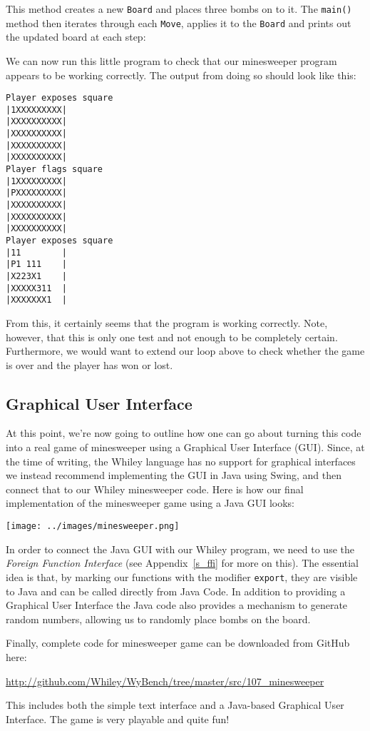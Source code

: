 

This method creates a new \lstinline{Board} and places three bombs on to it.  The \lstinline{main()} method then iterates through each \lstinline{Move}, applies it to the \lstinline{Board} and prints out the updated board at each step:



We can now run this little program to check that our minesweeper program appears to be working correctly.  The output from doing so should look like this:

\begin{lstlisting}
Player exposes square
|1XXXXXXXXX|
|XXXXXXXXXX|
|XXXXXXXXXX|
|XXXXXXXXXX|
|XXXXXXXXXX|
Player flags square
|1XXXXXXXXX|
|PXXXXXXXXX|
|XXXXXXXXXX|
|XXXXXXXXXX|
|XXXXXXXXXX|
Player exposes square
|11        |
|P1 111    |
|X223X1    |
|XXXXX311  |
|XXXXXXX1  |
\end{lstlisting}
From this, it certainly seems that the program is working correctly.  Note, however, that this is only one test and not enough to be completely certain.  Furthermore, we would want to extend our loop above to check whether the game is over and the player has won or lost.
\subsection{Graphical User Interface}
At this point, we're now going to outline how one can go about turning this code into a real game of minesweeper using a Graphical User Interface (GUI).  Since, at the time of writing, the Whiley language has no support for graphical interfaces we instead recommend implementing the GUI in Java using Swing, and then connect that to our Whiley minesweeper code.  Here is how our final implementation of the minesweeper game using a Java GUI looks:
\begin{center}
\texttt{[image: ../images/minesweeper.png]}
\end{center}

In order to connect the Java GUI with our Whiley program, we need to use the {\em Foreign Function Interface} (see Appendix~\ref{s_ffi} for more on this).  The essential idea is that, by marking our functions with the modifier \lstinline{export}, they are visible to Java and can be called directly from Java Code.  In addition to providing a Graphical User Interface the Java code also provides a mechanism to generate random numbers, allowing us to randomly place bombs on the board.

Finally, complete code for minesweeper game can be downloaded from GitHub here: 
\begin{center}
\url{http://github.com/Whiley/WyBench/tree/master/src/107_minesweeper}
\end{center}
This includes both the simple text interface and a Java-based Graphical User Interface.  The game is very playable and quite fun!